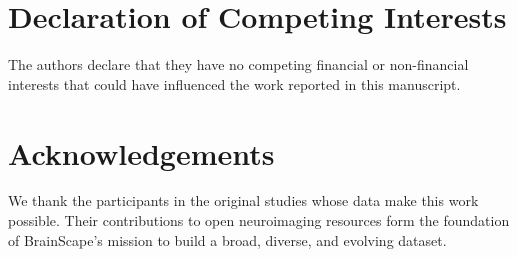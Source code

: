 \section*{Declaration of Competing Interests}

The authors declare that they have no competing financial or non-financial interests 
that could have influenced the work reported in this manuscript.

\section*{Acknowledgements}

We thank the participants in the original studies whose data make this work possible. 
Their contributions to open neuroimaging resources form the foundation of BrainScape's 
mission to build a broad, diverse, and evolving dataset.
